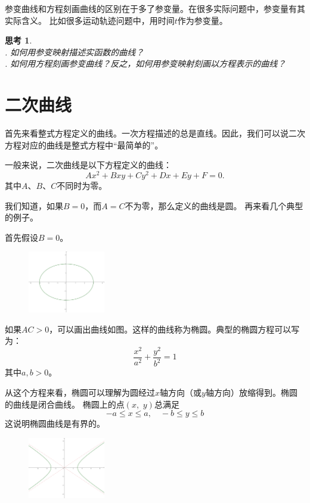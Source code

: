 \documentclass[12pt,UTF8]{ctexbook}
\theoremstyle{definition}
\theoremstyle{plain}
\newtheorem{sk}{思考}[section]
\begin{document}
参变曲线和方程刻画曲线的区别在于多了参变量。在很多实际问题中，参变量有其实际含义。
比如很多运动轨迹问题中，用时间$t$作为参变量。

\begin{sk}
    \mbox{} \\
    . 如何用参变映射描述实函数的曲线？\\
    . 如何用方程刻画参变曲线？反之，如何用参变映射刻画以方程表示的曲线？
\end{sk}

\section{二次曲线}

首先来看整式方程定义的曲线。一次方程描述的总是直线。因此，我们可以说二次方程对应的曲线是整式方程中“最简单的”。

一般来说，二次曲线是以下方程定义的曲线：
$$ Ax^2 + Bxy + Cy^2 + Dx + Ey + F = 0.$$
其中$A$、$B$、$C$不同时为零。

我们知道，如果$B = 0$，而$A = C$不为零，那么定义的曲线是圆。
再来看几个典型的例子。

首先假设$B = 0$。

\begin{figure} %
    \vspace{-30pt}
    \flushright
    \includegraphics[width=0.3\textwidth]{tu/椭圆1.png}
\end{figure}

如果$AC > 0$，可以画出曲线如图。这样的曲线称为椭圆。典型的椭圆方程可以写为：
$$ \frac{x^2}{a^2} + \frac{y^2}{b^2} = 1 $$
其中$a,b>0$。

从这个方程来看，椭圆可以理解为圆经过$x$轴方向（或$y$轴方向）放缩得到。椭圆的曲线是闭合曲线。
椭圆上的点$(x,\,\,y)$总满足
$$ -a \leqslant x \leqslant a, \quad -b \leqslant y \leqslant b$$
这说明椭圆曲线是有界的。

\begin{figure} %
    \vspace{-12pt}
    \flushright
    \includegraphics[width=0.3\textwidth]{tu/双曲线1.png}
\end{figure}
\end{document}
